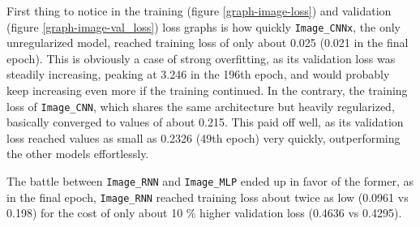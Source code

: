 First thing to notice in the training (figure \ref{graph-image-loss}) and validation (figure \ref{graph-image-val_loss})
loss graphs is how quickly \texttt{Image\_CNNx}, the only unregularized model, reached training loss of only about 0.025
(0.021 in the final epoch). This is obviously a case of strong overfitting, as its validation loss was steadily
increasing, peaking at 3.246 in the 196th epoch, and would probably keep increasing even more if the training continued.
In the contrary, the training loss of \texttt{Image\_CNN}, which shares the same architecture but heavily regularized,
basically converged to values of about 0.215. This paid off well, as its validation loss reached values
as small as 0.2326 (49th epoch) very quickly, outperforming the other models effortlessly.

The battle between \texttt{Image\_RNN} and \texttt{Image\_MLP} ended up in favor of the former,
as in the final epoch, \texttt{Image\_RNN} reached training loss about twice as low (0.0961 vs 0.198)
for the cost of only about 10 \% higher validation loss (0.4636 vs 0.4295).


